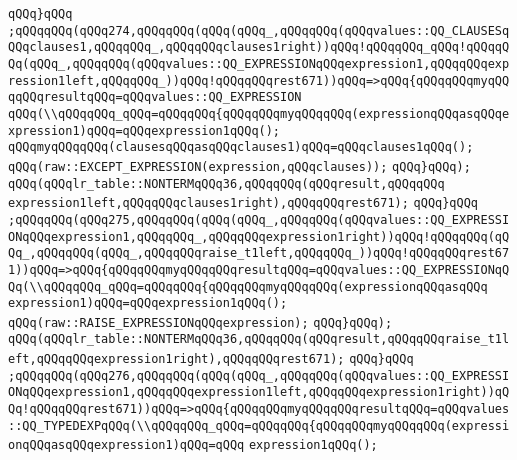 \verb|qQQq}qQQq|\newline
\verb|;qQQqqQQq(qQQq274,qQQqqQQq(qQQq(qQQq_,qQQqqQQq(qQQqvalues::QQ_CLAUSESqQQqclauses1,qQQqqQQq_,qQQqqQQqclauses1right))qQQq!qQQqqQQq_qQQq!qQQqqQQq(qQQq_,qQQqqQQq(qQQqvalues::QQ_EXPRESSIONqQQqexpression1,qQQqqQQqexpression1left,qQQqqQQq_))qQQq!qQQqqQQqrest671))qQQq=>qQQq{qQQqqQQqmyqQQqqQQqresultqQQq=qQQqvalues::QQ_EXPRESSION|\newline
\verb|qQQq(\\qQQqqQQq_qQQq=qQQqqQQq{qQQqqQQqmyqQQqqQQq(expressionqQQqasqQQqexpression1)qQQq=qQQqexpression1qQQq();|\newline
\verb|qQQqmyqQQqqQQq(clausesqQQqasqQQqclauses1)qQQq=qQQqclauses1qQQq();|\newline
\verb|qQQq(raw::EXCEPT_EXPRESSION(expression,qQQqclauses));|\newline
\verb|qQQq}qQQq);|\newline
\verb|qQQq(qQQqlr_table::NONTERMqQQq36,qQQqqQQq(qQQqresult,qQQqqQQq|\newline
\verb|expression1left,qQQqqQQqclauses1right),qQQqqQQqrest671);|\newline
\verb|qQQq}qQQq|\newline
\verb|;qQQqqQQq(qQQq275,qQQqqQQq(qQQq(qQQq_,qQQqqQQq(qQQqvalues::QQ_EXPRESSIONqQQqexpression1,qQQqqQQq_,qQQqqQQqexpression1right))qQQq!qQQqqQQq(qQQq_,qQQqqQQq(qQQq_,qQQqqQQqraise_t1left,qQQqqQQq_))qQQq!qQQqqQQqrest671))qQQq=>qQQq{qQQqqQQqmyqQQqqQQqresultqQQq=qQQqvalues::QQ_EXPRESSIONqQQq(\\qQQqqQQq_qQQq=qQQqqQQq{qQQqqQQqmyqQQqqQQq(expressionqQQqasqQQq|\newline
\verb|expression1)qQQq=qQQqexpression1qQQq();|\newline
\verb|qQQq(raw::RAISE_EXPRESSIONqQQqexpression);|\newline
\verb|qQQq}qQQq);|\newline
\verb|qQQq(qQQqlr_table::NONTERMqQQq36,qQQqqQQq(qQQqresult,qQQqqQQqraise_t1left,qQQqqQQqexpression1right),qQQqqQQqrest671);|\newline
\verb|qQQq}qQQq|\newline
\verb|;qQQqqQQq(qQQq276,qQQqqQQq(qQQq(qQQq_,qQQqqQQq(qQQqvalues::QQ_EXPRESSIONqQQqexpression1,qQQqqQQqexpression1left,qQQqqQQqexpression1right))qQQq!qQQqqQQqrest671))qQQq=>qQQq{qQQqqQQqmyqQQqqQQqresultqQQq=qQQqvalues::QQ_TYPEDEXPqQQq(\\qQQqqQQq_qQQq=qQQqqQQq{qQQqqQQqmyqQQqqQQq(expressionqQQqasqQQqexpression1)qQQq=qQQq|\newline
\verb|expression1qQQq();|\newline
